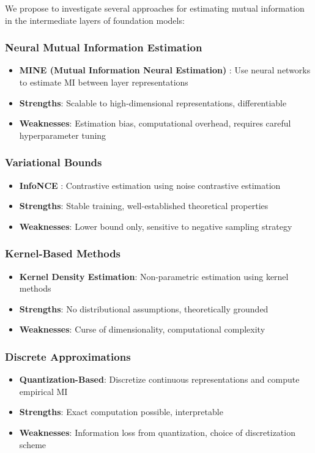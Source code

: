 We propose to investigate several approaches for estimating mutual information in the intermediate layers of foundation models:

\subsubsection{Neural Mutual Information Estimation}
\begin{itemize}
    \item \textbf{MINE (Mutual Information Neural Estimation)} \citep{belghazi2018mutual}: Use neural networks to estimate MI between layer representations
    \item \textbf{Strengths}: Scalable to high-dimensional representations, differentiable
    \item \textbf{Weaknesses}: Estimation bias, computational overhead, requires careful hyperparameter tuning
\end{itemize}

\subsubsection{Variational Bounds}
\begin{itemize}
    \item \textbf{InfoNCE} \citep{oord2018representation}: Contrastive estimation using noise contrastive estimation
    \item \textbf{Strengths}: Stable training, well-established theoretical properties
    \item \textbf{Weaknesses}: Lower bound only, sensitive to negative sampling strategy
\end{itemize}

\subsubsection{Kernel-Based Methods}
\begin{itemize}
    \item \textbf{Kernel Density Estimation}: Non-parametric estimation using kernel methods
    \item \textbf{Strengths}: No distributional assumptions, theoretically grounded
    \item \textbf{Weaknesses}: Curse of dimensionality, computational complexity
\end{itemize}

\subsubsection{Discrete Approximations}
\begin{itemize}
    \item \textbf{Quantization-Based}: Discretize continuous representations and compute empirical MI
    \item \textbf{Strengths}: Exact computation possible, interpretable
    \item \textbf{Weaknesses}: Information loss from quantization, choice of discretization scheme
\end{itemize}

